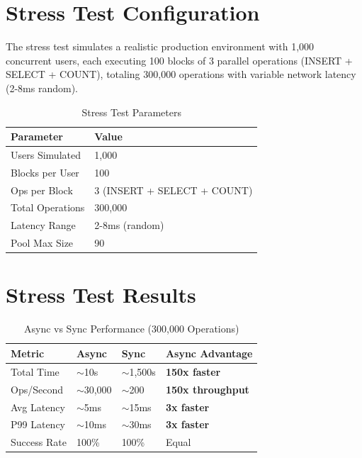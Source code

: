 \documentclass[12pt,a4paper]{report}
\begin{document}
\section{Stress Test Configuration}

The stress test simulates a realistic production environment with 1,000 concurrent users, each executing 100 blocks of 3 parallel operations (INSERT + SELECT + COUNT), totaling 300,000 operations with variable network latency (2-8ms random).

\begin{table}[H]
	\centering
	\caption{Stress Test Parameters}
	\begin{tabular}{@{}ll@{}}
		\toprule
		\textbf{Parameter} & \textbf{Value}              \\
		\midrule
		Users Simulated    & 1,000                       \\
		Blocks per User    & 100                         \\
		Ops per Block      & 3 (INSERT + SELECT + COUNT) \\
		Total Operations   & 300,000                     \\
		Latency Range      & 2-8ms (random)              \\
		Pool Max Size      & 90                          \\
		\bottomrule
	\end{tabular}
\end{table}

\section{Stress Test Results}

\begin{table}[H]
	\centering
	\caption{Async vs Sync Performance (300,000 Operations)}
	\begin{tabular}{@{}llll@{}}
		\toprule
		\textbf{Metric} & \textbf{Async} & \textbf{Sync} & \textbf{Async Advantage}                            \\
		\midrule
		Total Time      & $\sim$10s      & $\sim$1,500s  & \textcolor{blue!70!black}{\textbf{150x faster}}     \\
		Ops/Second      & $\sim$30,000   & $\sim$200     & \textcolor{blue!70!black}{\textbf{150x throughput}} \\
		Avg Latency     & $\sim$5ms      & $\sim$15ms    & \textcolor{blue!70!black}{\textbf{3x faster}}       \\
		P99 Latency     & $\sim$10ms     & $\sim$30ms    & \textcolor{blue!70!black}{\textbf{3x faster}}       \\
		Success Rate    & 100\%          & 100\%         & Equal                                               \\
		\bottomrule
	\end{tabular}
\end{table}
\end{document}
